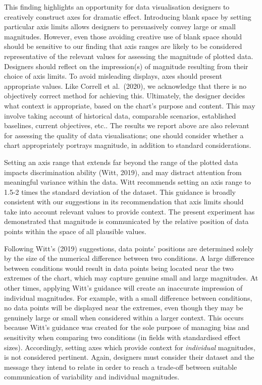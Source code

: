 \documentclass[journal]{vgtc}                %
\begin{document}
This finding highlights an opportunity for data visualisation designers to creatively construct axes for dramatic effect. Introducing blank space by setting particular axis limits allows designers to persuasively convey large or small magnitudes. However, even those avoiding creative use of blank space should should be sensitive to our finding that axis ranges are likely to be considered representative of the relevant values for assessing the magnitude of plotted data. Designers should reflect on the impression(s) of magnitude resulting from their choice of axis limits. To avoid misleading displays, axes should present appropriate values. Like Correll et al.~(2020), we acknowledge that there is no objectively correct method for achieving this. Ultimately, the designer decides what context is appropriate, based on the chart's purpose and content. This may involve taking account of historical data, comparable scenarios, established baselines, current objectives, etc.. The results we report above are also relevant for assessing the quality of data visualisations; one should consider whether a chart appropriately portrays magnitude, in addition to standard considerations.

Setting an axis range that extends far beyond the range of the plotted data impacts discrimination ability (Witt, 2019), and may distract attention from meaningful variance within the data. Witt recommends setting an axis range to 1.5-2 times the standard deviation of the dataset. This guidance is broadly consistent with our suggestions in its recommendation that axis limits should take into account relevant values to provide context. The present experiment has demonstrated that magnitude is communicated by the relative position of data points within the space of all plausible values.

Following Witt's (2019) suggestions, data points' positions are determined solely by the size of the numerical difference between two conditions. A large difference between conditions would result in data points being located near the two extremes of the chart, which may capture genuine small and large magnitudes. At other times, applying Witt's guidance will create an inaccurate impression of individual magnitudes. For example, with a small difference between conditions, no data points will be displayed near the extremes, even though they may be genuinely large or small when considered within a larger context. This occurs because Witt's guidance was created for the sole purpose of managing bias and sensitivity when comparing two conditions (in fields with standardised effect sizes). Accordingly, setting axes which provide context for \emph{individual} magnitudes, is not considered pertinent. Again, designers must consider their dataset and the message they intend to relate in order to reach a trade-off between suitable communication of variability and individual magnitudes.
\end{document}
